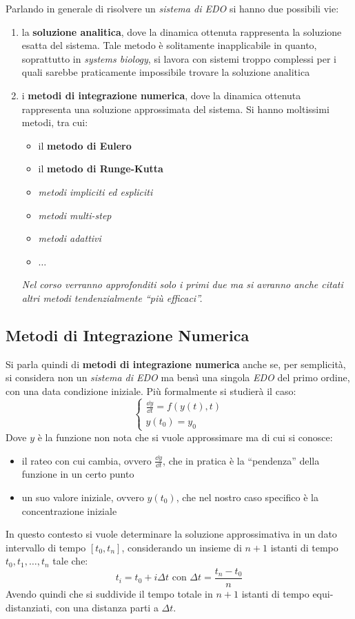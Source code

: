\documentclass[a4paper,12pt, oneside]{book}
\begin{document}
Parlando in generale di risolvere un \textit{sistema di EDO} si hanno due
possibili vie:
\begin{enumerate}
  \item la \textbf{soluzione analitica}, dove la dinamica ottenuta rappresenta
  la soluzione esatta del sistema. Tale metodo è solitamente inapplicabile in
  quanto, soprattutto in \textit{systems biology}, si lavora con sistemi troppo
  complessi per i quali sarebbe praticamente impossibile trovare la soluzione
  analitica
  \item i \textbf{metodi di integrazione numerica}, dove la dinamica ottenuta
  rappresenta una soluzione approssimata del sistema. Si hanno moltissimi
  metodi, tra cui:
  \begin{itemize}
    \item il \textbf{metodo di Eulero}
    \item il \textbf{metodo di Runge-Kutta}
    \item \textit{metodi impliciti ed espliciti}
    \item \textit{metodi multi-step}
    \item \textit{metodi adattivi}
    \item $\ldots$
  \end{itemize}
  \textit{Nel corso verranno approfonditi solo i primi due ma si avranno anche
    citati altri metodi tendenzialmente ``più efficaci''.}
\end{enumerate}
\subsection{Metodi di Integrazione Numerica}
Si parla quindi di \textbf{metodi di integrazione numerica} anche se, per
semplicità, si considera non un \textit{sistema di EDO} ma bensì una singola
\textit{EDO} del primo ordine, con una data condizione iniziale. Più formalmente
si studierà il caso:
\[
  \begin{cases}
    \frac{\dd{y}}{\dd{t}}=f(y(t),t)\\
    y(t_0) = y_0
  \end{cases}
\]
Dove $y$ è la funzione non nota che si vuole approssimare ma di cui si conosce:
\begin{itemize}
  \item il rateo con cui cambia, ovvero $\frac{\dd{y}}{\dd{t}}$, che in pratica
  è la ``pendenza'' della funzione in un certo punto
  \item un suo valore iniziale, ovvero $ y(t_0)$, che nel nostro caso specifico
  è la concentrazione iniziale
\end{itemize}
In questo contesto si vuole determinare la soluzione approssimativa in un dato
intervallo di tempo $[t_0,t_n]$, considerando un insieme di $n+1$ istanti di
tempo  $t_0, t_1,\ldots, t_n$ tale che:
\[t_i=t_0+i\Delta t\mbox{ con } \Delta t=\frac{t_n-t_0}{n}\]
Avendo quindi che si suddivide il tempo totale in $n+1$ istanti di tempo
equi-distanziati, con una distanza parti a $\Delta t$.
\end{document}
